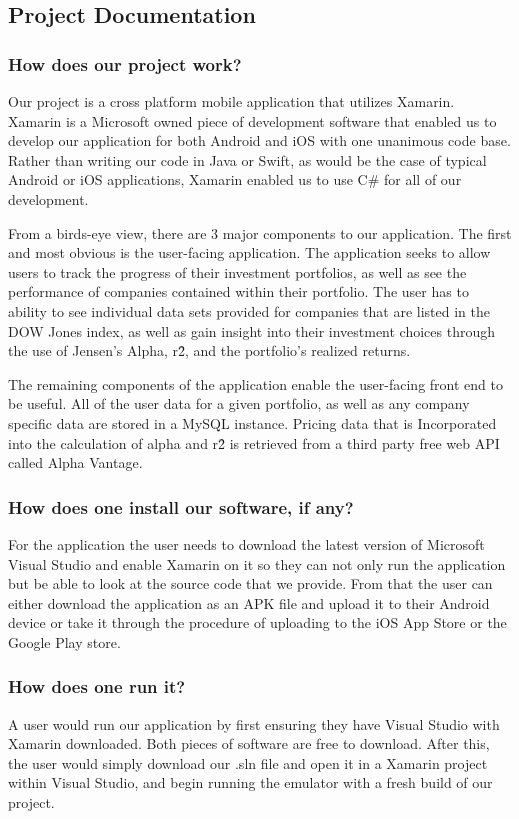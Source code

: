 \documentclass[onecolumn, draftclsnofoot,10pt, compsoc]{IEEEtran}
\begin{document}
\newpage
\subsection{Project Documentation}
\subsubsection{How does our project work?}
Our project is a cross platform mobile application that utilizes Xamarin. Xamarin is a Microsoft owned piece of development software that enabled us to develop our application for both Android and iOS with one unanimous code base. Rather than writing our code in Java or Swift, as would be the case of typical Android or iOS applications, Xamarin enabled us to use C\# for all of our development.

From a birds-eye view, there are 3 major components to our application. The first and most obvious is the user-facing application. The application seeks to allow users to track the progress of their investment portfolios, as well as see the performance of companies contained within their portfolio. The user has to ability to see individual data sets provided for companies that are listed in the DOW Jones index, as well as gain insight into their investment choices through the use of Jensen's Alpha, r\^2, and the portfolio's realized returns.

The remaining components of the application enable the user-facing front end to be useful. All of the user data for a given portfolio, as well as any company specific data are stored in a MySQL instance. Pricing data that is Incorporated into the calculation of alpha and r\^2 is retrieved from a third party free web API called Alpha Vantage. 


\subsubsection{How does one install our software, if any?}
For the application the user needs to download the latest version of Microsoft Visual Studio and enable Xamarin on it so they can not only run the application but be able to look at the source code that we provide. From that the user can either download the application as an APK file and upload it to their Android device or take it through the procedure of uploading to the iOS App Store or the Google Play store. 
\subsubsection{How does one run it?}
A user would run our application by first ensuring they have Visual Studio with Xamarin downloaded. Both pieces of software are free to download. After this, the user would simply download our .sln file and open it in a Xamarin project within Visual Studio, and begin running the emulator with a fresh build of our project.
\end{document}
